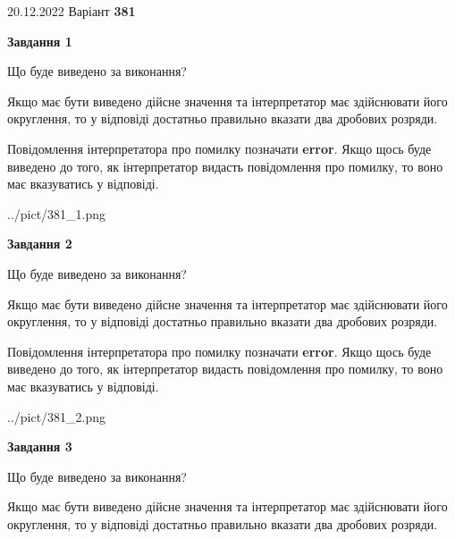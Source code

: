 \documentclass[12pt, ukrainian]{article}
\begin{document}
{20.12.2022 Варіант \No \textbf { 381 }\par}
{
\begin {Large}

{\begin {center}\textbf{Завдання 1}\end {center}}\par
Що буде виведено за виконання? \par

Якщо має бути виведено дійсне значення та інтерпретатор має здійснювати його округлення, 
то у відповіді достатньо правильно вказати два дробових розряди.

Повідомлення інтерпретатора про помилку позначати \textbf{error}.
Якщо щось буде виведено до того, як інтерпретатор видасть повідомлення про помилку, 
то воно має вказуватись у відповіді. \par

\begin{center}
	{../pict/381_1.png}
\end{center}
\newpage

{\begin {center}\textbf{Завдання 2}\end {center}}\par
Що буде виведено за виконання? \par

Якщо має бути виведено дійсне значення та інтерпретатор має здійснювати його округлення, 
то у відповіді достатньо правильно вказати два дробових розряди.

Повідомлення інтерпретатора про помилку позначати \textbf{error}.
Якщо щось буде виведено до того, як інтерпретатор видасть повідомлення про помилку, 
то воно має вказуватись у відповіді. \par

\begin{center}
	{../pict/381_2.png}
\end{center}
\newpage

{\begin {center}\textbf{Завдання 3}\end {center}}\par
Що буде виведено за виконання? \par

Якщо має бути виведено дійсне значення та інтерпретатор має здійснювати його округлення, 
то у відповіді достатньо правильно вказати два дробових розряди.


\end{Large}}
\end{document}
